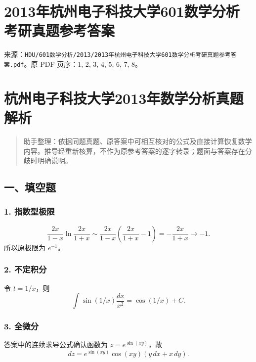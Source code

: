 \documentclass[11pt,fontset=fandol]{ctexart}
\begin{document}
\section{2013年杭州电子科技大学601数学分析考研真题参考答案}\label{ux5e74ux676dux5ddeux7535ux5b50ux79d1ux6280ux5927ux5b66601ux6570ux5b66ux5206ux6790ux8003ux7814ux771fux9898ux53c2ux8003ux7b54ux6848}

来源：\texttt{HDU/601数学分析/2013/2013年杭州电子科技大学601数学分析考研真题参考答案.pdf}。原
PDF 页序：1, 2, 3, 4, 5, 6, 7, 8。

\section{杭州电子科技大学2013年数学分析真题解析}\label{ux676dux5ddeux7535ux5b50ux79d1ux6280ux5927ux5b662013ux5e74ux6570ux5b66ux5206ux6790ux771fux9898ux89e3ux6790}

\begin{quote}
助手整理：依据同题真题、原答案中可相互核对的公式及直接计算恢复数学内容。推导经重新核算，不作为原参考答案的逐字转录；题面与答案存在分歧时明确说明。
\end{quote}

\subsection{一、填空题}\label{ux4e00ux586bux7a7aux9898}

\subsubsection{1. 指数型极限}\label{ux6307ux6570ux578bux6781ux9650}

\[
\frac{2x}{1-x}\ln\frac{2x}{1+x}
\sim\frac{2x}{1-x}\left(\frac{2x}{1+x}-1\right)
=-\frac{2x}{1+x}\longrightarrow-1.
\] 所以原极限为 \(\boxed{e^{-1}}\)。

\subsubsection{2. 不定积分}\label{ux4e0dux5b9aux79efux5206}

令 \(t=1/x\)，则 \[
\boxed{\int\sin(1/x)\frac{dx}{x^2}=\cos(1/x)+C.}
\]

\subsubsection{3. 全微分}\label{ux5168ux5faeux5206}

答案中的连续求导公式确认函数为 \(z=e^{\sin(xy)}\)，故 \[
\boxed{dz=e^{\sin(xy)}\cos(xy)(y\,dx+x\,dy).}
\]
\end{document}
